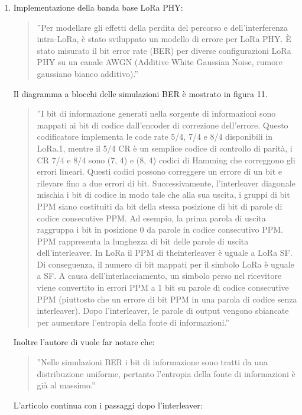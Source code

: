 \documentclass[a4paper]{report} %
\begin{document}
\begin{enumerate}
\item Implementazione della banda base LoRa PHY: 
\begin{quote}
	''Per modellare gli effetti della perdita del percorso e dell'interferenza intra-LoRa, è stato sviluppato un modello di errore per LoRa PHY. È stato misurato il bit error rate (BER) per diverse configurazioni LoRa PHY su un canale AWGN (Additive White Gaussian Noise, rumore gaussiano bianco additivo).''
\end{quote}
Il diagramma a blocchi delle simulazioni BER è mostrato in figura 11. 
\begin{quote}
	''I bit di informazione generati nella sorgente di informazioni sono mappati ai bit di codice dall'encoder di correzione dell'errore. Questo codificatore implementa le code rate 5/4, 7/4 e 8/4 disponibili in LoRa.1, mentre il 5/4 CR è un semplice codice di controllo di parità, i CR 7/4 e 8/4 sono (7, 4) e (8, 4) codici di Hamming che correggono gli errori lineari. Questi codici possono correggere un errore di un bit e rilevare fino a due errori di bit. Successivamente, l'interleaver diagonale mischia i bit di codice in modo tale che alla sua uscita, i gruppi di bit PPM siano costituiti da bit della stessa posizione di bit di parole di codice consecutive PPM. Ad esempio, la prima parola di uscita raggruppa i bit in posizione 0 da parole in codice consecutivo PPM. PPM rappresenta la lunghezza di bit delle parole di uscita dell'interleaver. In LoRa il PPM di theinterleaver è uguale a LoRa SF. Di conseguenza, il numero di bit mappati per il simbolo LoRa è uguale a SF. A causa dell'interlacciamento, un simbolo perso nel ricevitore viene convertito in errori PPM a 1 bit su parole di codice consecutive PPM (piuttosto che un errore di bit PPM in una parola di codice senza interleaver). Dopo l'interleaver, le parole di output vengono sbiancate per aumentare l'entropia della fonte di informazioni.''
\end{quote}
Inoltre l'autore di \cite{art:rif.49} vuole far notare che:
\begin{quote}
	''Nelle simulazioni BER i bit di informazione sono tratti da una distribuzione uniforme, pertanto l'entropia della fonte di informazioni è già al massimo.''
\end{quote}
L'articolo continua con i passaggi dopo l'interleaver:

\end{enumerate}
\end{document}

